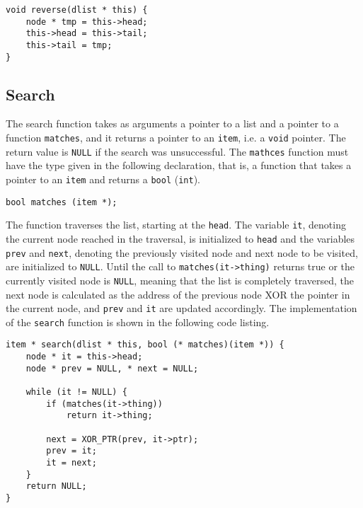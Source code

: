 \documentclass[11pt]{article}
\newcommand{\code}[1]{{\tt #1}}
\begin{document}
\begin{lstlisting}
void reverse(dlist * this) {
    node * tmp = this->head;
    this->head = this->tail;
    this->tail = tmp;
}
\end{lstlisting}

\subsection{Search}
The search function takes as arguments a pointer to a list and a pointer to a
function \code{matches}, and it returns a pointer to an \code{item}, i.e. a
\code{void} pointer. The return value is \code{NULL} if the search was
unsuccessful. The \code{mathces} function must have the type given in the
following declaration, that is, a function that takes a pointer to an
\code{item} and returns a \code{bool} (\code{int}).
\begin{lstlisting}
bool matches (item *);
\end{lstlisting}
The function traverses the list, starting at the \code{head}. The variable
\code{it}, denoting the current node reached in the traversal, is initialized to
\code{head} and the variables \code{prev} and \code{next}, denoting the
previously visited node and next node to be visited, are initialized to
\code{NULL}. Until the call to \code{matches(it->thing)} returns true or the
currently visited node is \code{NULL}, meaning that the list is completely
traversed, the next node is calculated as the address of the previous node XOR
the pointer in the current node, and \code{prev} and \code{it} are updated
accordingly. The implementation of the \code{search} function is shown in the
following code listing.
\begin{lstlisting}
item * search(dlist * this, bool (* matches)(item *)) {
    node * it = this->head;
    node * prev = NULL, * next = NULL;

    while (it != NULL) {
        if (matches(it->thing))
            return it->thing;

        next = XOR_PTR(prev, it->ptr);
        prev = it;
        it = next;
    }
    return NULL;
}
\end{lstlisting}
\end{document}
